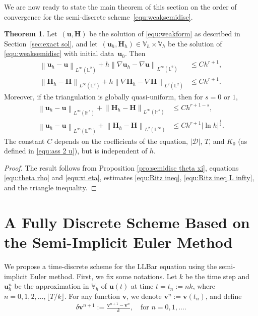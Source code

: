 \documentclass[11pt, reqno]{amsart}
\theoremstyle{definition}
\newtheorem{theorem}{Theorem}[section]
\theoremstyle{remark}
\numberwithin{equation}{section}
\newcommand{\bff}{\boldsymbol}
\newcommand{\bb}{\mathbb}
\newcommand{\norm}[2]{\left\|{#1}\right\|_{#2}}
\newcommand{\abs}[1]{\left|{#1}\right|}
\begin{document}
We are now ready to state the main theorem of this section on the order of convergence for the semi-discrete scheme~\eqref{equ:weaksemidisc}.

\begin{theorem}\label{the:semidisc rate}
Let~$(\bff{u},\bff{H})$ be the solution of \eqref{equ:weakform} as described in Section~\ref{sec:exact sol}, and let~$(\bff{u}_h,\bff{H}_h)\in \bb{V}_h\times \bb{V}_h$ be the solution of \eqref{equ:weaksemidisc} with initial data~$\bff{u}_0$. Then
\begin{align*}
	\norm{\bff{u}_h - \bff{u}}{L^\infty(\bb{L}^2)} 
	+
	h \norm{\nabla \bff{u}_h - \nabla \bff{u}}{L^\infty(\bb{L}^2)}
	&\leq
	Ch^{r+1},
	\\
	\norm{\bff{H}_h - \bff{H}}{L^\infty(\bb{L}^2)} 
	+
	h \norm{\nabla \bff{H}_h - \nabla \bff{H}}{L^2(\bb{L}^2)}
	&\leq
	Ch^{r+1}.
\end{align*}
Moreover, if the triangulation is globally quasi-uniform, then for $s=0$ or $1$,
\begin{align*}
	\norm{\bff{u}_h - \bff{u}}{L^\infty(\bb{H}^s)}
	+
	\norm{\bff{H}_h - \bff{H}}{L^\infty(\bb{H}^s)}
	&\leq
	Ch^{r+1-s},
	\\
	\norm{\bff{u}_h - \bff{u}}{L^\infty(\bb{L}^\infty)}
	+
	\norm{\bff{H}_h - \bff{H}}{L^2(\bb{L}^\infty)}
	&\leq
	Ch^{r+1} \abs{\ln h}^{\frac{1}{2}}.
\end{align*}
The constant $C$ depends on the coefficients of the equation, $|\mathscr{D}|$, $T$, and $K_0$ (as defined in \eqref{equ:ass 2 u}), but is independent of $h$.

\begin{proof}
The result follows from Proposition \ref{pro:semidisc theta xi}, equations \eqref{equ:theta rho} and \eqref{equ:xi eta}, estimates \eqref{equ:Ritz ineq}, \eqref{equ:Ritz ineq L infty}, and the triangle inequality.
\end{proof}
\end{theorem}


\section{A Fully Discrete Scheme Based on the Semi-Implicit Euler Method}\label{sec:Euler}

We propose a time-discrete scheme for the LLBar equation using the semi-implicit Euler method. First, we fix some notations. Let $k$ be the time step and $\bff{u}_h^n$ be the approximation in $\bb{V}_h$ of $\bff{u}(t)$ at time $t=t_n:=nk$, where $n=0,1,2,\ldots, \lfloor T/k \rfloor$. For any function $\bff{v}$, we denote $\bff{v}^n:= \bff{v}(t_n)$, and define
\begin{align*}
	\delta \bff{v}^{n+1} :=
	\frac{\bff{v}^{n+1}-\bff{v}^{n}}{k},\quad
	\text{for } n=0,1,\ldots.
\end{align*}
\end{document}
